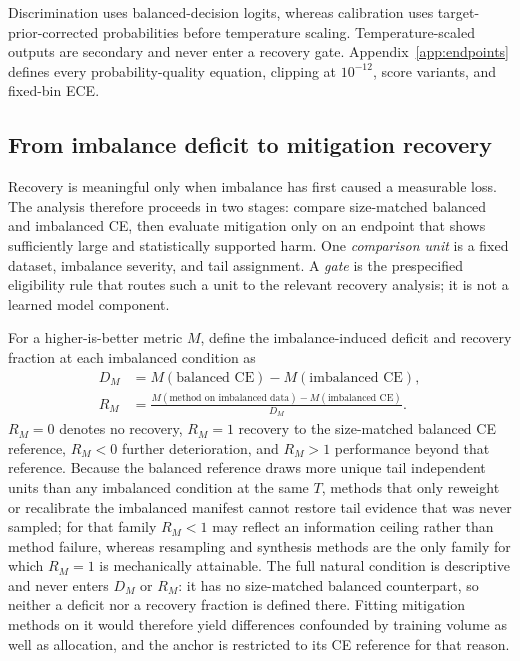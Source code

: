 \documentclass[11pt]{article}
\begin{document}
Discrimination uses balanced-decision logits, whereas calibration uses target-prior-corrected probabilities before temperature scaling. Temperature-scaled outputs are secondary and never enter a recovery gate. Appendix~\ref{app:endpoints} defines every probability-quality equation, clipping at $10^{-12}$, score variants, and fixed-bin ECE.

\subsection{From imbalance deficit to mitigation recovery}
\label{sec:recovery}
Recovery is meaningful only when imbalance has first caused a measurable loss. The analysis therefore proceeds in two stages: compare size-matched balanced and imbalanced CE, then evaluate mitigation only on an endpoint that shows sufficiently large and statistically supported harm. One \emph{comparison unit} is a fixed dataset, imbalance severity, and tail assignment. A \emph{gate} is the prespecified eligibility rule that routes such a unit to the relevant recovery analysis; it is not a learned model component.

For a higher-is-better metric $M$, define the imbalance-induced deficit and recovery fraction at each imbalanced condition as
\begin{equation}
  \begin{aligned}
    D_M &= M(\text{balanced CE})-M(\text{imbalanced CE}),\\
    R_M &= \frac{M(\text{method on imbalanced data})
      -M(\text{imbalanced CE})}{D_M}.
  \end{aligned}
  \label{eq:recovery}
\end{equation}
$R_M=0$ denotes no recovery, $R_M=1$ recovery to the size-matched balanced CE reference, $R_M<0$ further deterioration, and $R_M>1$ performance beyond that reference. Because the balanced reference draws more unique tail independent units than any imbalanced condition at the same $T$, methods that only reweight or recalibrate the imbalanced manifest cannot restore tail evidence that was never sampled; for that family $R_M<1$ may reflect an information ceiling rather than method failure, whereas resampling and synthesis methods are the only family for which $R_M=1$ is mechanically attainable. The full natural condition is descriptive and never enters $D_M$ or $R_M$: it has no size-matched balanced counterpart, so neither a deficit nor a recovery fraction is defined there. Fitting mitigation methods on it would therefore yield differences confounded by training volume as well as allocation, and the anchor is restricted to its CE reference for that reason.
\end{document}
